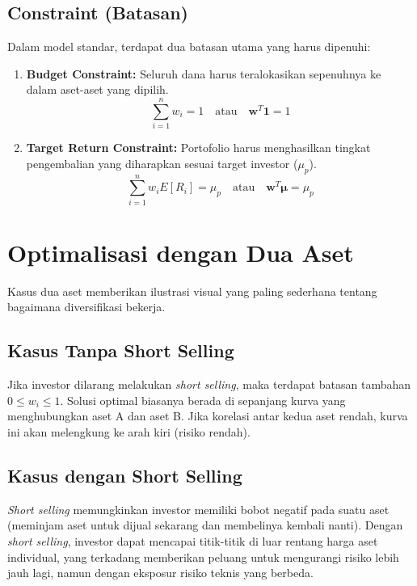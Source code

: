 \documentclass[12pt,a4paper]{book}
\begin{document}
\subsection{Constraint (Batasan)}
Dalam model standar, terdapat dua batasan utama yang harus dipenuhi:
\begin{enumerate}
    \item \textbf{Budget Constraint:} Seluruh dana harus teralokasikan sepenuhnya ke dalam aset-aset yang dipilih.
    \begin{equation}
        \sum_{i=1}^{n} w_i = 1 \quad \text{atau} \quad \mathbf{w}^T \mathbf{1} = 1
    \end{equation}
    \item \textbf{Target Return Constraint:} Portofolio harus menghasilkan tingkat pengembalian yang diharapkan sesuai target investor ($\mu_p$).
    \begin{equation}
        \sum_{i=1}^{n} w_i E[R_i] = \mu_p \quad \text{atau} \quad \mathbf{w}^T \mathbf{\mu} = \mu_p
    \end{equation}
\end{enumerate}

\section{Optimalisasi dengan Dua Aset}
Kasus dua aset memberikan ilustrasi visual yang paling sederhana tentang bagaimana diversifikasi bekerja.

\subsection{Kasus Tanpa Short Selling}
Jika investor dilarang melakukan \textit{short selling}, maka terdapat batasan tambahan $0 \le w_i \le 1$. Solusi optimal biasanya berada di sepanjang kurva yang menghubungkan aset A dan aset B. Jika korelasi antar kedua aset rendah, kurva ini akan melengkung ke arah kiri (risiko rendah).

\subsection{Kasus dengan Short Selling}
\textit{Short selling} memungkinkan investor memiliki bobot negatif pada suatu aset (meminjam aset untuk dijual sekarang dan membelinya kembali nanti). Dengan \textit{short selling}, investor dapat mencapai titik-titik di luar rentang harga aset individual, yang terkadang memberikan peluang untuk mengurangi risiko lebih jauh lagi, namun dengan eksposur risiko teknis yang berbeda.
\end{document}
